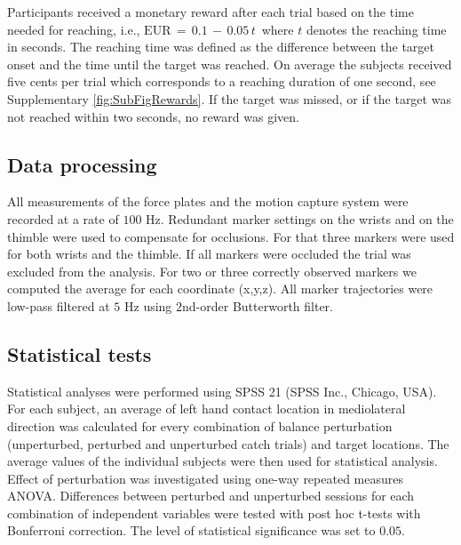 Participants received a monetary reward after each trial based on the time
needed for reaching, i.e., $\textrm{EUR}\,=\,0.1 \, - \, 0.05 \, t\,$ where $t$ denotes the reaching time in seconds. 
The reaching time was defined as the difference between the target onset and the time until the target
was reached. On average the subjects received five cents per trial which corresponds to a reaching duration of one second, see Supplementary \FigureAbbr \ref{fig:SubFigRewards}. %
 If the target was missed, or if the target was not reached within
two seconds, no reward was given. 

\subsection{Data processing}

All measurements of the force plates and the motion capture system were recorded at a rate of $100$ Hz. Redundant marker settings on the
wrists and on the thimble were used to compensate for occlusions. For that three markers were used 
for both wrists and the thimble. If all markers were occluded the trial was excluded from the analysis. 
For two or three correctly observed markers we computed the average for each coordinate (x,y,z). 
All marker trajectories were low-pass filtered at $5$ Hz using $2$nd-order Butterworth filter.


\subsection{Statistical tests}

Statistical analyses were performed using SPSS 21 (SPSS Inc., Chicago, USA). For 
each subject, an average of left hand contact location in mediolateral direction 
was calculated for every combination of balance perturbation (unperturbed, 
perturbed and unperturbed catch trials) and target locations. The average values 
of the individual subjects were then used for statistical analysis. Effect of 
perturbation was investigated using one-way repeated measures ANOVA. Differences 
between perturbed and unperturbed sessions for each combination of independent 
variables were tested with post hoc t-tests with Bonferroni correction. The 
level of statistical significance was set to $0.05$.
    
